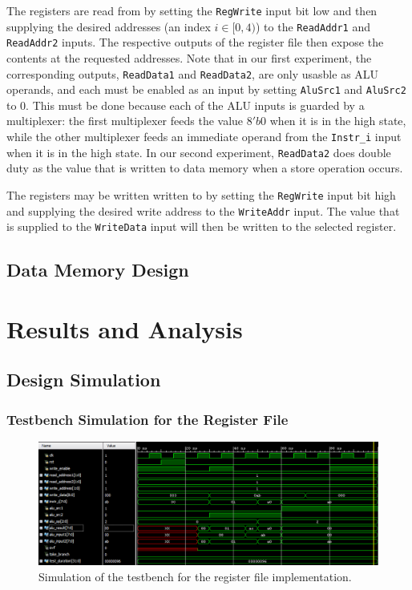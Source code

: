 \documentclass[12pt, letterpaper]{article}
\begin{document}
The registers are read from by setting the \texttt{RegWrite} input bit low and then supplying the desired addresses (an index $i \in [0, 4)$) to the \texttt{ReadAddr1} and \texttt{ReadAddr2} inputs.  The respective outputs of the register file then expose the contents at the requested addresses.  Note that in our first experiment, the corresponding outputs, \texttt{ReadData1} and \texttt{ReadData2}, are only usasble as ALU operands, and each must be enabled as an input by setting \texttt{AluSrc1} and \texttt{AluSrc2} to $0$.  This must be done because each of the ALU inputs is guarded by a multiplexer: the first multiplexer feeds the value $8'b0$ when it is in the high state, while the other multiplexer feeds an immediate operand from the \texttt{Instr\_i} input when it is in the high state.  In our second experiment, \texttt{ReadData2} does double duty as the value that is written to data memory when a store operation occurs. 

The registers may be written written to by setting the \texttt{RegWrite} input bit high and supplying the desired write address to the \texttt{WriteAddr} input.  The value that is supplied to the \texttt{WriteData} input will then be written to the selected register.

\subsection{Data Memory Design}


\newpage
\section{Results and Analysis}

\subsection{Design Simulation}

\subsubsection{Testbench Simulation for the Register File}
\begin{figure}[h]
\includegraphics[width=\linewidth]{images/lab4-results-1.png}
\caption{Simulation of the testbench for the register file implementation.}
\end{figure}
\end{document}
